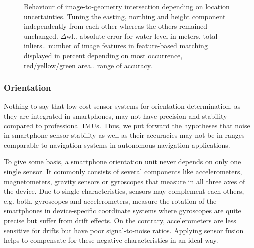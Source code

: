 \documentclass[review]{elsarticle}
\begin{document}
\begin{figure}[htbp!]
\begin{center}
\begin{minipage}{\columnwidth}
	 		\centering
	 	\end{minipage}
	
	\caption{Behaviour of image-to-geometry intersection depending on location uncertainties. Tuning the easting, northing and height component independently from each other whereas the others remained unchanged. ${\Delta}$wl.. absolute error for water level in meters, total inliers.. number of image features in feature-based matching displayed in percent depending on most occurrence, red/yellow/green area.. range of accuracy.}
	\label{fig:sensor_sensi_location}
\end{center}
\end{figure}




\subsubsection{Orientation}
\label{sec:technology:sensors:orientation}


Nothing to say that low-cost sensor systems for orientation determination, as they are integrated in smartphones, may not have precision and stability compared to professional \glspl{IMU}. Thus, we put forward the hypotheses that noise in smartphone sensor stability as well as their accuracies may not be in ranges comparable to navigation systems in autonomous navigation applications.

To give some basis, a smartphone orientation unit never depends on only one single sensor. It commonly consists of several components like accelerometers, magnetometers, gravity sensors or gyroscopes that measure in all three axes of the device. Due to single characteristics, sensors may complement each others, e.g. both, gyroscopes and accelerometers, measure the rotation of the smartphones in device-specific coordinate systems where gyroscopes are quite precise but suffer from drift effects. On the contrary, accelerometers are less sensitive for drifts but have poor signal-to-noise ratios. Applying sensor fusion helps to compensate for these negative characteristics in an ideal way. 
\end{document}

